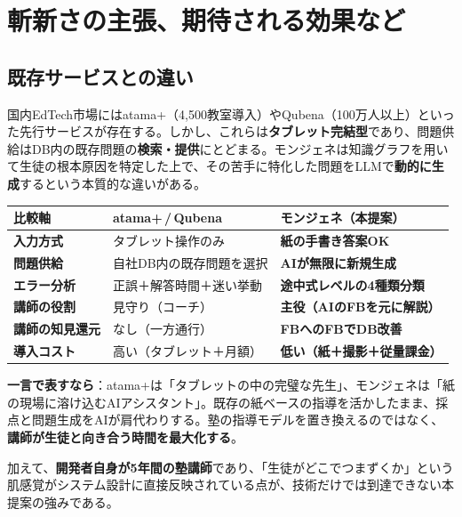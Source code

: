 \documentclass[paper=a4,fontsize=10.5bp,jafontsize=10.5bp,twocolumn]{jlreq}
\begin{document}
\section{斬新さの主張、期待される効果など}

\subsection{既存サービスとの違い}

国内EdTech市場にはatama+（4,500教室導入）やQubena（100万人以上）といった先行サービスが存在する。しかし、これらは\textbf{タブレット完結型}であり、問題供給はDB内の既存問題の\textbf{検索・提供}にとどまる。モンジェネは知識グラフを用いて生徒の根本原因を特定した上で、その苦手に特化した問題をLLMで\textbf{動的に生成}するという本質的な違いがある。

\begin{footnotesize}\noindent
\begin{tabularx}{\linewidth}{>{\bfseries}l X X}
\toprule
比較軸 & atama+\,/\,Qubena & モンジェネ（本提案） \\
\midrule
入力方式 & タブレット操作のみ & \textbf{紙の手書き答案OK} \\
問題供給 & 自社DB内の既存問題を選択 & \textbf{AIが無限に新規生成} \\
エラー分析 & 正誤＋解答時間＋迷い挙動 & \textbf{途中式レベルの4種類分類} \\
講師の役割 & 見守り（コーチ） & \textbf{主役（AIのFBを元に解説）} \\
講師の知見還元 & なし（一方通行） & \textbf{FBへのFBでDB改善} \\
導入コスト & 高い（タブレット＋月額） & \textbf{低い（紙＋撮影＋従量課金）} \\
\bottomrule
\end{tabularx}
\end{footnotesize}

\begin{highlightbox}
\textbf{一言で表すなら}：atama+は「タブレットの中の完璧な先生」、モンジェネは「紙の現場に溶け込むAIアシスタント」。既存の紙ベースの指導を活かしたまま、採点と問題生成をAIが肩代わりする。塾の指導モデルを置き換えるのではなく、\textbf{講師が生徒と向き合う時間を最大化する}。
\end{highlightbox}

\noindent
加えて、\textbf{開発者自身が5年間の塾講師}であり、「生徒がどこでつまずくか」という肌感覚がシステム設計に直接反映されている点が、技術だけでは到達できない本提案の強みである。
\end{document}
